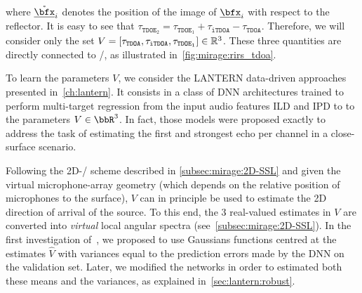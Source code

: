 where $\mathring{\positionMicrophone}_i$ denotes the position of the image of $\positionMicrophone_i$ with respect to the reflector.
It is easy to see that $\tau_{\mathtt{TDOE}_2} =  \tau_{\mathtt{TDOE}_1} + \tau_\mathtt{iTDOA} - \tau_\mathtt{TDOA}$.
Therefore, we will consider only the set $V = \klist{\tau_{\mathtt{TDOA}}, \tau_{\mathtt{iTDOA}}, \tau_{\mathtt{TDOE}_1}}\in\mathbb{R}^3$.
These three quantities are directly connected to \RIRs/, as illustrated in~\cref{fig:mirage:rirs_tdoa}.

\mynewline
To learn the parameters $V$, we consider the \acs{LANTERN} data-driven approaches presented in~\cref{ch:lantern}.
It consists in a class of \ac{DNN} architectures trained to perform multi-target regression from the input audio features \acf{ILD} and \acf{IPD} to to the parameters $V\in\bbR^3$.
In fact, those models were proposed exactly to address the task of estimating the first and strongest echo per channel in a close-surface scenario.

\mynewline
Following the 2D-\SSL/ scheme described in \cref{subsec:mirage:2D-SSL} and given the virtual microphone-array geometry (which depends on the relative position of microphones to the surface), $V$ can in principle be used to estimate the 2D direction of arrival of the source.
To this end, the 3 real-valued estimates in $V$ are converted into \textit{virtual} local angular spectra (see~\cref{subsec:mirage:2D-SSL}).
In the first investigation of~, we proposed to use Gaussians functions centred at the estimates $\hat{V}$ with variances equal to the prediction errors made by the \ac{DNN} on the validation set.
Later, we modified the networks in order to estimated both these means and the variances, as explained in~\cref{sec:lantern:robust}.

